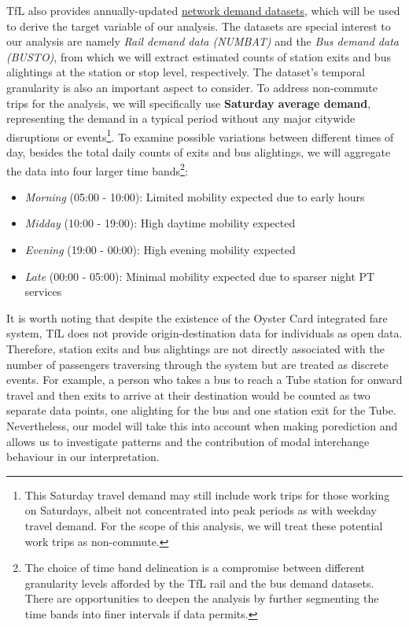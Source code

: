 TfL also provides annually-updated \href{http://crowding.data.tfl.gov.uk/}{network demand datasets}, which will be used to derive the target variable of our analysis. The datasets are special interest to our analysis are namely \textit{Rail demand data (NUMBAT)} and the \textit{Bus demand data (BUSTO)}, from which we will extract estimated counts of station exits and bus alightings at the station or stop level, respectively. The dataset's temporal granularity is also an important aspect to consider. To address non-commute trips for the analysis, we will specifically use \textbf{Saturday average demand}, representing the demand in a typical period without any major citywide disruptions or events\footnote{This Saturday travel demand may still include work trips for those working on Saturdays, albeit not concentrated into peak periods as with weekday travel demand. For the scope of this analysis, we will treat these potential work trips as non-commute.}. To examine possible variations between different times of day, besides the total daily counts of exits and bus alightings, we will aggregate the data into four larger time bands\footnote{The choice of time band delineation is a compromise between different granularity levels afforded by the TfL rail and the bus demand datasets. There are opportunities to deepen the analysis by further segmenting the time bands into finer intervals if data permits.}:

\begin{itemize}
    \setlength\itemsep{-0.2em}
    \item \textit{Morning} (05:00 - 10:00): Limited mobility expected due to early hours
    \item \textit{Midday} (10:00 - 19:00): High daytime mobility expected
    \item \textit{Evening} (19:00 - 00:00): High evening mobility expected
    \item \textit{Late} (00:00 - 05:00): Minimal mobility expected due to sparser night PT services
\end{itemize}

It is worth noting that despite the existence of the Oyster Card integrated fare system, TfL does not provide origin-destination data for individuals as open data. Therefore, station exits and bus alightings are not directly associated with the number of passengers traversing through the system but are treated as discrete events. For example, a person who takes a bus to reach a Tube station for onward travel and then exits to arrive at their destination would be counted as two separate data points, one alighting for the bus and one station exit for the Tube. Nevertheless, our model will take this into account when making porediction and allows us to investigate patterns and the contribution of modal interchange behaviour in our interpretation.

